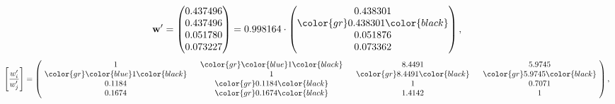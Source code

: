 \begin{example}
\begin{equation*}
\mathbf{w}^{\prime} =
\begin{pmatrix}
0.437496\\
0.437496\\
0.051780\\
0.073227
\end{pmatrix} =
0.998164\cdot
\begin{pmatrix}
0.438301\\
\color{gr} 0.438301\color{black} \\
0.051876\\
0.073362
\end{pmatrix},
\end{equation*}
\begin{equation*}
\left[ \frac{{w}^{\prime}_i}{{w}^{\prime}_j} \right] =
\begin{pmatrix}
$\,\,$ 1 $\,\,$ & $\,\,$\color{gr} \color{blue} 1\color{black} $\,\,$ & $\,\,$8.4491$\,\,$ & $\,\,$5.9745$\,\,$ \\
$\,\,$\color{gr} \color{blue} 1\color{black} $\,\,$ & $\,\,$ 1 $\,\,$ & $\,\,$\color{gr} 8.4491\color{black} $\,\,$ & $\,\,$\color{gr} 5.9745\color{black}   $\,\,$ \\
$\,\,$0.1184$\,\,$ & $\,\,$\color{gr} 0.1184\color{black} $\,\,$ & $\,\,$ 1 $\,\,$ & $\,\,$0.7071 $\,\,$ \\
$\,\,$0.1674$\,\,$ & $\,\,$\color{gr} 0.1674\color{black} $\,\,$ & $\,\,$1.4142$\,\,$ & $\,\,$ 1  $\,\,$ \\
\end{pmatrix},
\end{equation*}
\end{example}
\newpage
